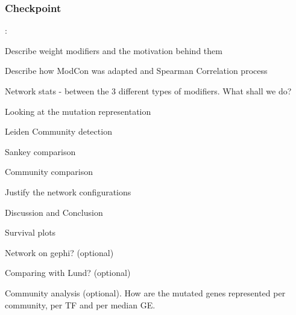 \subsubsection{Checkpoint}:
\begin{todolist}
    \item [\done] Describe weight modifiers and the motivation behind them
    \item [\done] Describe how ModCon was adapted and Spearman Correlation process 
    \item [\done] Network stats - between the 3 different types of modifiers. What shall we do?
    \item [\done] Looking at the mutation representation 
    \item [\done] Leiden Community detection
    \item [\done] Sankey comparison
    \item [\done] Community comparison 
    \item [\done] Justify the network configurations
    \item [\done] Discussion and Conclusion
    \item Survival plots
    \item Network on gephi? (optional)
    \item Comparing with Lund? (optional)
    \item Community analysis (optional). How are the mutated genes represented per community, per TF and per median GE.
\end{todolist}